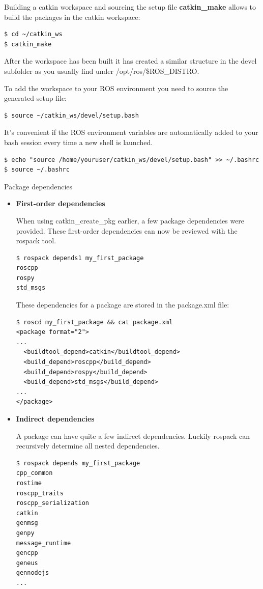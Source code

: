 \begin{frame}[fragile]{Building a catkin workspace and sourcing the setup file}
\textbf{catkin\_make} allows to build the packages in the catkin workspace: 

\begin{lstlisting}[language=shell]
$ cd ~/catkin_ws
$ catkin_make
\end{lstlisting}

After the workspace has been built it has created a similar structure in the devel subfolder as you usually find under /opt/ros/\$ROS\_DISTRO.

\vspace{.1cm}
To add the workspace to your ROS environment you need to source the generated setup file: 

\begin{lstlisting}[language=shell]
$ source ~/catkin_ws/devel/setup.bash
\end{lstlisting}

It's convenient if the ROS environment variables are automatically added to your bash session every time a new shell is launched.
\begin{lstlisting}[language=shell]
$ echo "source /home/youruser/catkin_ws/devel/setup.bash" >> ~/.bashrc
$ source ~/.bashrc
\end{lstlisting}
\end{frame}

\begin{frame}{Package dependencies}
 \begin{itemize}
  \item \textbf{First-order dependencies}
  
  \vspace{.1cm}
  When using catkin\_create\_pkg earlier, a few package dependencies were provided. These first-order dependencies can now be reviewed with the rospack tool. 
\begin{lstlisting}[language=shell]
$ rospack depends1 my_first_package
roscpp
rospy
std_msgs
\end{lstlisting}
  These dependencies for a package are stored in the package.xml file: 
\begin{lstlisting}[language=shell]
$ roscd my_first_package && cat package.xml
<package format="2">
...
  <buildtool_depend>catkin</buildtool_depend>
  <build_depend>roscpp</build_depend>
  <build_depend>rospy</build_depend>
  <build_depend>std_msgs</build_depend>
...
</package>
\end{lstlisting}  
  \item \textbf{Indirect dependencies}
  
  \vspace{.1cm}
  A package can have quite a few indirect dependencies. Luckily rospack can recursively determine all nested dependencies. 
\begin{lstlisting}[language=shell]
$ rospack depends my_first_package
cpp_common
rostime
roscpp_traits
roscpp_serialization
catkin
genmsg
genpy
message_runtime
gencpp
geneus
gennodejs
...
\end{lstlisting}
 \end{itemize}
\end{frame}

